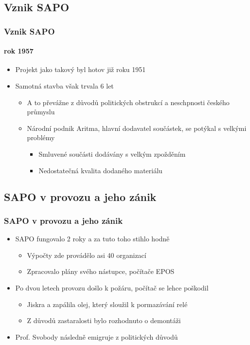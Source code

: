 \documentclass{beamer}
\begin{document}
\subsection{Vznik SAPO}
    \begin{frame}
        \frametitle{Vznik SAPO}
        \framesubtitle{rok 1957}
        \begin{itemize}
            \item Projekt jako takový byl hotov již roku 1951
            \item Samotná stavba však trvala 6 let
            \begin{itemize}
              \item A to převážne z důvodů politických obstrukcí a neschpnosti českého průmyslu
              \item Národní podnik Aritma, hlavní dodavatel součástek, se potýkal s velkými problémy
                  \begin{itemize}
                      \item Smluvené součásti dodávány s velkým zpožděním
                      \item Nedostatečná kvalita dodaného materiálu
                  \end{itemize}
            \end{itemize}
        \end{itemize}
    \end{frame}
\subsection{SAPO v provozu a jeho zánik}
    \begin{frame}
        \frametitle{SAPO v provozu a jeho zánik}
        \begin{itemize}
            \item SAPO fungovalo 2 roky a za tuto toho stihlo hodně
                \begin{itemize}
                    \item Výpočty zde provádělo asi 40 organizací
                    \item Zpracovalo plány svého nástupce, počítače EPOS
                \end{itemize}
            \item Po dvou letech provozu došlo k požáru, počítač se lehce poškodil
                \begin{itemize}
                    \item Jiskra a zapálila olej, který sloužil k pormazávání relé
                    \item Z důvodů zastaralosti bylo rozhodnuto o demontáži
                \end{itemize}
            \item Prof. Svobody následně emigruje z politických důvodů
        \end{itemize}
    \end{frame}
\end{document}
